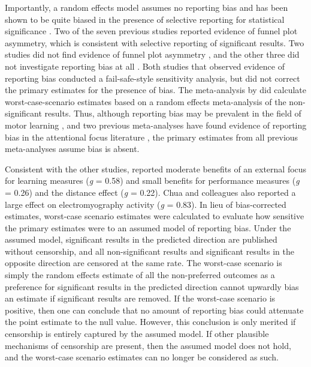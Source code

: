 \documentclass[man,floatsintext,letterpaper,12pt]{apa7}
\begin{document}
Importantly, a random effects model assumes no reporting bias and has been shown to be quite biased in the presence of selective reporting for statistical significance \autocite{bartos2023a,bom2019,carter2015,carter2019,kvarven2020,stanley2017,stanley2022}. Two of the seven previous studies \autocite{chua2021,kim2017} reported evidence of funnel plot asymmetry, which is consistent with selective reporting of significant results. Two studies did not find evidence of funnel plot asymmetry \autocite{nicklas2022,li2022}, and the other three did not investigate reporting bias at all \autocite{grgic2021,grgic2022,makaruk2020}. Both studies that observed evidence of reporting bias conducted a fail-safe-style sensitivity analysis, but did not correct the primary estimates for the presence of bias. The meta-analysis by \textcite{chua2021} did calculate worst-case-scenario estimates based on a random effects meta-analysis of the non-significant results. Thus, although reporting bias may be prevalent in the field of motor learning \autocite{lohse2016}, and two previous meta-analyses have found evidence of reporting bias in the attentional focus literature \autocite{chua2021,kim2017}, the primary estimates from all previous meta-analyses assume bias is absent.

Consistent with the other studies, \textcite{chua2021} reported moderate benefits of an external focus for learning measures (\emph{g} = 0.58) and small benefits for performance measures (\emph{g} = 0.26) and the distance effect (\emph{g} = 0.22). Chua and colleagues also reported a large effect on electromyography activity (\emph{g} = 0.83). In lieu of bias-corrected estimates, worst-case scenario estimates were calculated to evaluate how sensitive the primary estimates were to an assumed model of reporting bias. Under the assumed model, significant results in the predicted direction are published without censorship, and all non-significant results and significant results in the opposite direction are censored at the same rate. The worst-case scenario is simply the random effects estimate of all the non-preferred outcomes as a preference for significant results in the predicted direction cannot upwardly bias an estimate if significant results are removed. If the worst-case scenario is positive, then one can conclude that no amount of reporting bias could attenuate the point estimate to the null value. However, this conclusion is only merited if censorship is entirely captured by the assumed model. If other plausible mechanisms of censorship are present, then the assumed model does not hold, and the worst-case scenario estimates can no longer be considered as such.
\end{document}
